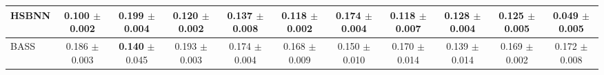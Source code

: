 \begin{table}[t]
{\begin{tabular}{lcccccccccc}
\midrule
\shortstack[l]{HSBNN \\ {}} & \shortstack{0.100 \\ $\pm$ 0.002} & \shortstack{0.199 \\ $\pm$ 0.004} & \shortstack{0.120 \\ $\pm$ 0.002} & \shortstack{0.137 \\ $\pm$ 0.008} & \shortstack{0.118 \\ $\pm$ 0.002} & \shortstack{0.174 \\ $\pm$ 0.004} & \shortstack{0.118 \\ $\pm$ 0.007} & \shortstack{0.128 \\ $\pm$ 0.004} & \shortstack{0.125 \\ $\pm$ 0.005} & \shortstack{\textbf{0.049} \\ $\pm$ 0.005} \\
\midrule
\shortstack[l]{BASS \\ {}} & \shortstack{0.186 \\ $\pm$ 0.003} & \shortstack{\textbf{0.140} \\ $\pm$ 0.045} & \shortstack{0.193 \\ $\pm$ 0.003} & \shortstack{0.174 \\ $\pm$ 0.004} & \shortstack{0.168 \\ $\pm$ 0.009} & \shortstack{0.150 \\ $\pm$ 0.010} & \shortstack{0.170 \\ $\pm$ 0.014} & \shortstack{0.139 \\ $\pm$ 0.014} & \shortstack{0.169 \\ $\pm$ 0.002} & \shortstack{0.172 \\ $\pm$ 0.008} \\
\bottomrule
\end{tabular}
}
\end{table}
